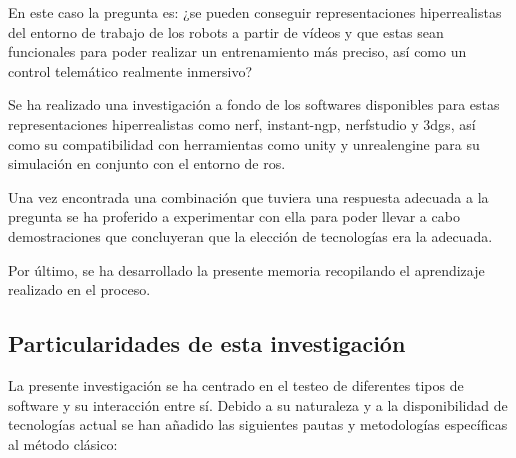 \documentclass[a4paper, 12pt, spanish, twoside]{article}
\begin{document}
En este caso la pregunta es: ¿se pueden conseguir representaciones hiperrealistas del entorno de trabajo de los robots a partir de vídeos y que estas sean funcionales para poder realizar un entrenamiento más preciso, así como un control telemático realmente inmersivo? 

Se ha realizado una investigación a fondo de los softwares disponibles para estas representaciones hiperrealistas como \acrshort{nerf}, \gls{instant-ngp}, \gls{nerfstudio} y \acrshort{3dgs}, así como su compatibilidad con herramientas como \gls{unity} y \gls{unrealengine} para su simulación en conjunto con el entorno de \acrshort{ros}. 

Una vez encontrada una combinación que tuviera una respuesta adecuada a la pregunta se ha proferido a experimentar con ella para poder llevar a cabo demostraciones que concluyeran que la elección de tecnologías era la adecuada. 

Por último, se ha desarrollado la presente memoria recopilando el aprendizaje realizado en el proceso. 

\subsection{Particularidades de esta investigación} \label{sec:metodologia:particularidades} 

La presente investigación se ha centrado en el testeo de diferentes tipos de software y su interacción entre sí. Debido a su naturaleza y a la disponibilidad de tecnologías actual se han añadido las siguientes pautas y metodologías específicas al método clásico: 
\end{document}
